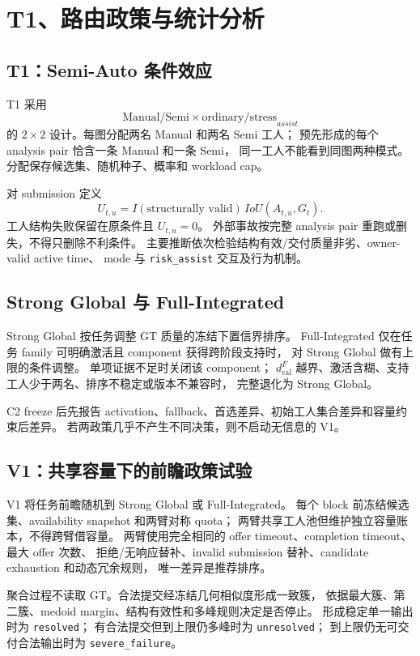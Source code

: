 \section{T1、路由政策与统计分析}

\subsection{T1：Semi-Auto 条件效应}

T1 采用
\[
\text{Manual/Semi}\times\text{ordinary/stress}_{assist}
\]
的 $2\times2$ 设计。每图分配两名 Manual 和两名 Semi 工人；
预先形成的每个 analysis pair 恰含一条 Manual 和一条 Semi，
同一工人不能看到同图两种模式。分配保存候选集、随机种子、概率和 workload cap。

对 submission 定义
\[
U_{t,u}=I(\text{structurally valid})\,IoU(A_{t,u},G_t).
\]
工人结构失败保留在原条件且 $U_{t,u}=0$。
外部事故按完整 analysis pair 重跑或删失，不得只删除不利条件。
主要推断依次检验结构有效/交付质量非劣、owner-valid active time、
mode 与 \texttt{risk\_assist} 交互及行为机制。

\subsection{Strong Global 与 Full-Integrated}

Strong Global 按任务调整 GT 质量的冻结下置信界排序。
Full-Integrated 仅在任务 family 可明确激活且 component 获得跨阶段支持时，
对 Strong Global 做有上限的条件调整。
单项证据不足时关闭该 component；
$d_{\mathrm{cal}}^F$ 越界、激活含糊、支持工人少于两名、排序不稳定或版本不兼容时，
完整退化为 Strong Global。

C2 freeze 后先报告 activation、fallback、首选差异、初始工人集合差异和容量约束后差异。
若两政策几乎不产生不同决策，则不启动无信息的 V1。

\subsection{V1：共享容量下的前瞻政策试验}

V1 将任务前瞻随机到 Strong Global 或 Full-Integrated。
每个 block 前冻结候选集、availability snapshot 和两臂对称 quota；
两臂共享工人池但维护独立容量账本，不得跨臂借容量。
两臂使用完全相同的 offer timeout、completion timeout、最大 offer 次数、
拒绝/无响应替补、invalid submission 替补、candidate exhaustion 和动态冗余规则，
唯一差异是推荐排序。

聚合过程不读取 GT。合法提交经冻结几何相似度形成一致簇，
依据最大簇、第二簇、medoid margin、结构有效性和多峰规则决定是否停止。
形成稳定单一输出时为 \texttt{resolved}；
有合法提交但到上限仍多峰时为 \texttt{unresolved}；
到上限仍无可交付合法输出时为 \texttt{severe\_failure}。

